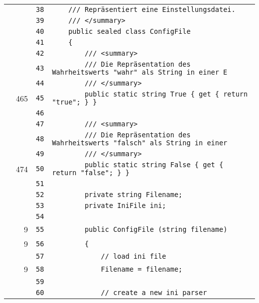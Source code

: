 \documentclass[a4paper,10pt]{article}
\begin{document}
\begin{longtable}[l]{lrrl}
\cellcolor{gray} &  & \verb~38~ & \verb~    /// Repräsentiert eine Einstellungsdatei.~\\
\cellcolor{gray} &  & \verb~39~ & \verb~    /// </summary>~\\
\cellcolor{gray} &  & \verb~40~ & \verb~    public sealed class ConfigFile~\\
\cellcolor{gray} &  & \verb~41~ & \verb~    {~\\
\cellcolor{gray} &  & \verb~42~ & \verb~        /// <summary>~\\
\cellcolor{gray} &  & \verb~43~ & \verb~        /// Die Repräsentation des Wahrheitswerts "wahr" als String in einer E~\\
\cellcolor{gray} &  & \verb~44~ & \verb~        /// </summary>~\\
\cellcolor{green} & 465 & \verb~45~ & \verb~        public static string True { get { return "true"; } }~\\
\cellcolor{gray} &  & \verb~46~ & \verb~~\\
\cellcolor{gray} &  & \verb~47~ & \verb~        /// <summary>~\\
\cellcolor{gray} &  & \verb~48~ & \verb~        /// Die Repräsentation des Wahrheitswerts "falsch" als String in einer~\\
\cellcolor{gray} &  & \verb~49~ & \verb~        /// </summary>~\\
\cellcolor{green} & 474 & \verb~50~ & \verb~        public static string False { get { return "false"; } }~\\
\cellcolor{gray} &  & \verb~51~ & \verb~~\\
\cellcolor{gray} &  & \verb~52~ & \verb~        private string Filename;~\\
\cellcolor{gray} &  & \verb~53~ & \verb~        private IniFile ini;~\\
\cellcolor{gray} &  & \verb~54~ & \verb~~\\
\cellcolor{green} & 9 & \verb~55~ & \verb~        public ConfigFile (string filename)~\\
\cellcolor{green} & 9 & \verb~56~ & \verb~        {~\\
\cellcolor{gray} &  & \verb~57~ & \verb~            // load ini file~\\
\cellcolor{green} & 9 & \verb~58~ & \verb~            Filename = filename;~\\
\cellcolor{gray} &  & \verb~59~ & \verb~~\\
\cellcolor{gray} &  & \verb~60~ & \verb~            // create a new ini parser~\\

\end{longtable}
\end{document}
